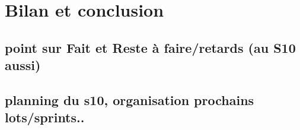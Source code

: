 \chapter{Bilan et conclusion}

\section{point sur Fait et Reste à faire/retards (au S10 aussi)}
\section{planning du s10, organisation prochains lots/sprints..}